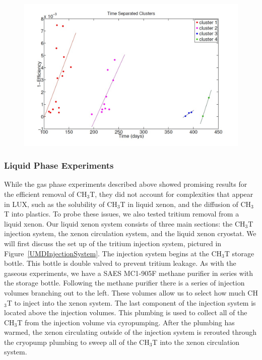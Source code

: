 \begin{figure}
\includegraphics[scale=.5]{GasPhaseRemoval_RestTime.jpg} 
\label{UMDGasRestTime}
\end{figure}



\subsubsection{Liquid Phase Experiments}

While the gas phase experiments described above showed promising results for the efficient removal of CH$_3$T, they did not account for complexities that appear in LUX, such as the solubility of CH$_3$T in liquid xenon, and the diffusion of CH$_3$T into plastics.  To probe these issues, we also tested tritium removal from a liquid xenon. Our liquid xenon system consists of three main sections: the CH$_3$T injection system, the xenon circulation system, and the liquid xenon cryostat. We will first discuss the set up of the tritium injection system, pictured in Figure~\ref{UMDInjectionSystem}. The injection system begins at the CH$_3$T storage bottle. This bottle is double valved to prevent tritium leakage. As with the gaseous experiments, we have a SAES MC1-905F methane purifier in series with the storage bottle. Following the methane purifier there is a series of injection volumes branching out to the left. These volumes allow us to select how much CH$_3$T to inject into the xenon system. The last component of the injection system is located above the injection volumes. This plumbing is used to collect all of the CH$_3$T from the injection volume via cyropumping. After the plumbing has warmed, the xenon circulating outside of the injection system is rerouted through the cryopump plumbing to sweep all of the CH$_3$T into the xenon circulation system. 


